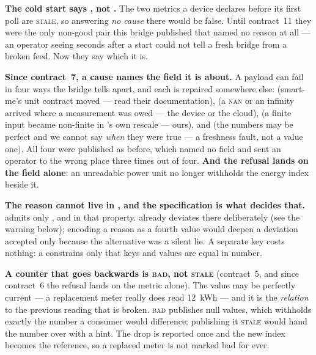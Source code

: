 \begin{note}
\textbf{The cold start says , not .} The two metrics a
device declares before its first poll are \textsc{stale}, so answering \emph{no cause} there
would be false. Until contract~11 they were the only non-good pair this bridge published that
named no reason at all --- an operator seeing  seconds after a start could not
tell a fresh bridge from a broken feed. Now they say which it is.
\end{note}

\begin{note}
\textbf{Since contract~7, a cause names the field it is about.} A payload can fail in four
ways the bridge tells apart, and each is repaired somewhere else:
 (smart-me's unit contract moved --- read their documentation),
 (a \textsc{nan} or an infinity arrived where a measurement was owed ---
the device or the cloud),  (a finite input became non-finite in
\prog's own rescale --- ours), and  (the numbers may be
perfect and we cannot say \emph{when} they were true --- a freshness fault, not a value one).
All four were published as  before, which named no field and sent an
operator to the wrong place three times out of four. \textbf{And the refusal lands on the
field alone}: an unreadable power unit no longer withholds the energy index beside it.
\end{note}

\begin{note}
\textbf{The reason cannot live in , and the specification is what decides
that.}  admits only ,
 and  in that property. \prog already deviates there deliberately (see
the warning below); encoding a reason as a fourth value would deepen a deviation accepted
only because the alternative was a silent lie. A separate key costs nothing: a
 constrains only that keys and values are equal in number.
\end{note}

\begin{note}
\textbf{A counter that goes backwards is \textsc{bad}, not \textsc{stale}} (contract~5, and
since contract~6 the refusal lands on the  metric alone). The
value may be perfectly current --- a replacement meter really does read 12~kWh --- and it is
the \emph{relation} to the previous reading that is broken. \textsc{bad} publishes null
values, which withholds exactly the number a consumer would difference; publishing it
\textsc{stale} would hand the number over with a hint. The drop is reported once and the new
index becomes the reference, so a replaced meter is not marked bad for ever.
\end{note}

